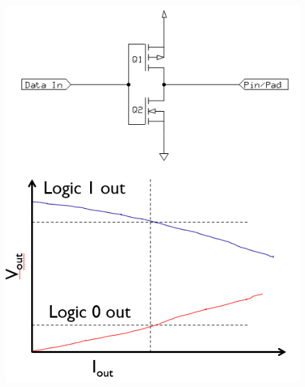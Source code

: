 \documentclass[10.5pt,scale=1.0,t,aspectratio=169,hyperref={pdfpagelabels=false}]{beamer}
\begin{document}
\begin{frame}
\begin{columns}
		\begin{figure}
			\centering
			\includegraphics[scale=0.35]{03_OutputDrain}
		\end{figure}
	\end{columns}
\end{frame}
\end{document}
